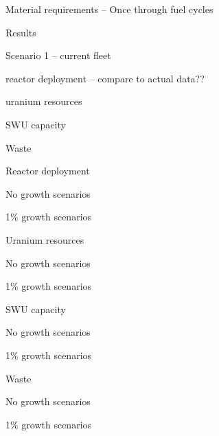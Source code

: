 \documentclass{report}
\begin{document}
\begin{outline}
\begin{outline}
\begin{outline}
    \end{outline}
\end{outline}

\item Material requirements -- Once through fuel cycles
\begin{outline}
    \item Results
    \begin{outline}
        \item Scenario 1 -- current fleet
        \begin{outline}
            \item reactor deployment -- compare to actual data??
            \item uranium resources
            \item SWU capacity
            \item Waste
        \end{outline}
        \item Reactor deployment
        \begin{outline}
            \item No growth scenarios
            \item 1\% growth scenarios
        \end{outline}
        \item Uranium resources
        \begin{outline}
            \item No growth scenarios
            \item 1\% growth scenarios
        \end{outline}
        \item SWU capacity
        \begin{outline}
            \item No growth scenarios
            \item 1\% growth scenarios
        \end{outline}
        \item Waste
        \begin{outline}
            \item No growth scenarios
            \item 1\% growth scenarios
        \end{outline}
    \end{outline}
\end{outline}


\end{outline}
\end{document}
